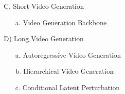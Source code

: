 \documentclass[lettersize,journal]{IEEEtran}
\begin{document}
\begin{enumerate}
    \item[C.]Short Video Generation
    \begin{enumerate}
        \item[a.]Video Generation Backbone
        
        
    \end{enumerate}
\end{enumerate}
\begin{enumerate}
    \item[D)]Long Video Generation
    \begin{enumerate}
        \item[a.]Autoregressive Video Generation
    
    \end{enumerate}
    \begin{enumerate}
        \item[b.]Hierarchical Video Generation
    
    \end{enumerate}
    \begin{enumerate}
        \item[c.]Conditional Latent Perturbation
    
    \end{enumerate}
\end{enumerate}
\end{document}
